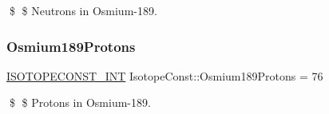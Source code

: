 \$ \$ Neutrons in Osmium-\/189. \mbox{\label{group___isotope_const-_osmium-_os189_gaf9f5bd5e9282b766e0f7093c3b1373fa}} 
\subsubsection{\texorpdfstring{Osmium189\+Protons}{Osmium189Protons}}
{\footnotesize\ttfamily \mbox{\hyperlink{group___isotope_const-_macros_ga5f18360b3e99483a35c32d789e62621c}{I\+S\+O\+T\+O\+P\+E\+C\+O\+N\+S\+T\+\_\+\+I\+NT}} Isotope\+Const\+::\+Osmium189\+Protons = 76}

\$ \$ Protons in Osmium-\/189. 